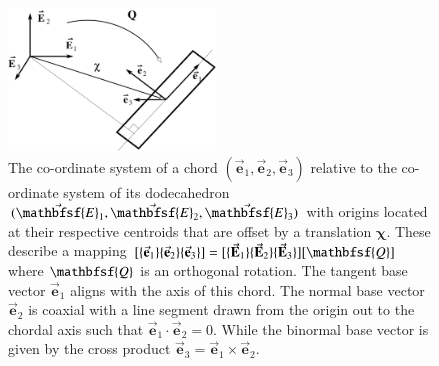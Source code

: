 \begin{figure}
    \centering
    \includegraphics[width=5.5cm]{figures/chord.pdf}
    \caption{The co-ordinate system of a chord $( \vec{\mathbf{e}}_1 , \vec{\mathbf{e}}_2 , \vec{\mathbf{e}}_3 )$ relative to the co-ordinate system of its dodecahedron $( \vec{\mathbfsf{E}}_1 , \vec{\mathbfsf{E}}_2 , \vec{\mathbfsf{E}}_3 )$ with origins located at their respective centroids that are offset by a translation $\boldsymbol{\chi}$.  These describe a mapping $[ \{ \vec{\mathbf{e}}_1 \} \{ \vec{\mathbf{e}}_2 \} \{ \vec{\mathbf{e}}_3 \} ] = [ \{ \vec{\mathbf{E}}_1 \} \{ \vec{\mathbf{E}}_2 \} \{ \vec{\mathbf{E}}_3 \} ] [ \mathbfsf{Q} ]$ where $\mathbfsf{Q}$ is an orthogonal rotation.  The tangent base vector $\vec{\mathbf{e}}_1$ aligns with the axis of this chord. The normal base vector $\vec{\mathbf{e}}_2$ is coaxial with a line segment drawn from the origin out to the chordal axis such that $\vec{\mathbf{e}}_1 \cdot \vec{\mathbf{e}}_2 = 0$. While the binormal base vector is given by the cross product $\vec{\mathbf{e}}_3 = \vec{\mathbf{e}}_1 \times \vec{\mathbf{e}}_2$.}
    \label{figchord}
\end{figure}

